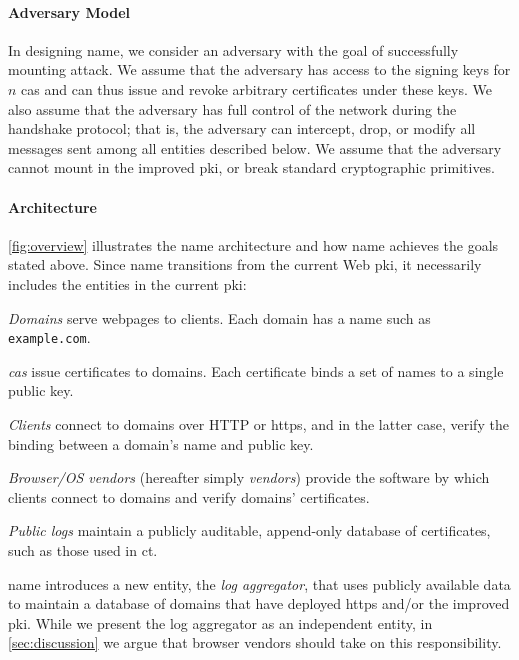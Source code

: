 \paragraph{Adversary Model}

In designing \ac{name}, we consider an adversary with the goal of successfully
mounting  attack. We assume that the adversary has access to the
signing keys for $n$ \acp{ca} and can thus issue and revoke arbitrary
certificates under these keys. We also assume that the adversary has full
control of the network during the handshake protocol; that is, the adversary can
intercept, drop, or modify all messages sent among all entities described
below. We assume that the adversary cannot mount  in the improved
\ac{pki}, or break standard cryptographic primitives.

\paragraph{Architecture}

\autoref{fig:overview} illustrates the \ac{name} architecture and how \ac{name}
achieves the goals stated above. Since \ac{name} transitions from the current
Web \ac{pki}, it necessarily includes the entities in the current \ac{pki}:
\begin{compactitem}
\item \emph{Domains} serve webpages to clients. Each domain has a name such as
  \texttt{example.com}.
\item \emph{\acp{ca}} issue certificates to domains. Each certificate binds a
  set of names to a single public key.
\item \emph{Clients} connect to domains over HTTP or \ac{https}, and in the
  latter case, verify the binding between a domain's name and public key.
\item \emph{Browser/OS vendors} (hereafter simply \emph{vendors}) provide the
  software by which clients connect to domains and verify domains' certificates.
\item \emph{Public logs} maintain a publicly auditable, append-only database of
  certificates, such as those used in \ac{ct}.
\end{compactitem}
\ac{name} introduces a new entity, the \emph{log aggregator}, that uses publicly
available data to maintain a database of domains that have deployed \ac{https}
and/or the improved \ac{pki}. While we present the log aggregator as an
independent entity, in \autoref{sec:discussion} we argue that browser vendors
should take on this responsibility.

